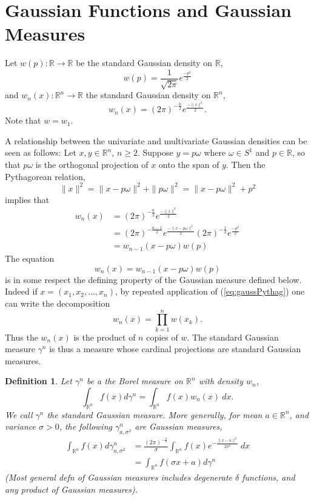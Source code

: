 \documentclass{amsart}
\newtheorem{definition}[theorem]{Definition}
\theoremstyle{remark}
\numberwithin{equation}{section}
\newcommand{\RR}{\mathbb{R}}
\begin{document}
\newpage
\section{Gaussian Functions and Gaussian Measures}
Let $w(p) : \RR \rightarrow \RR$  be the standard Gaussian density on $\RR$,
\[
    w(p) = \frac1{\sqrt{2\pi}}e^{\frac{-p^2}2}
\]
and $w_n(x) : \RR^n \rightarrow \RR$ the standard Gaussian density on $\RR^n$,
\[
    w_n(x) = (2\pi)^{-\frac n2} e^{\frac{-\|x\|^2}2}.
\]
Note that $w = w_1$.

A relationship between the univariate and multivariate Gaussian densities can be seen as follows: Let $x, y \in \RR^n$, $n \geq 2$. Suppose $y = p\omega$ where $\omega \in S^1$ and $p \in \RR$, so that $p\omega$ is the orthogonal projection of $x$ onto the span of $y$. Then the Pythagorean relation,
\[
    \|x\|^2 = \|x - p\omega\|^2 + \|p\omega\|^2 = \|x - p\omega\|^2 + p^2
\]
implies that
\begin{align*}
    w_n(x) 
    &= (2\pi)^{-\frac n2} e^{\frac{-\|x\|^2}2} \\
    &= (2\pi)^{-\frac{n-1}2} e^{\frac{-\|x - p\omega\|^2}2} (2\pi)^{-\frac12} e^{\frac{-p^2}2} \\
    &= w_{n-1}(x - p\omega)w(p)
\end{align*}
The equation
\begin{equation}\label{eq:gaussPythag}
    w_n(x) = w_{n-1}(x - p\omega)w(p)
\end{equation}
is in some respect the defining property of the Gaussian measure defined below. Indeed if $x = (x_1, x_2, \ldots, x_n)$, by repeated application of (\ref{eq:gaussPythag}) one can write the decomposition
\[
    w_n(x) = \prod_{k = 1}^n w(x_k).
\]
Thus the $w_n(x)$ is the product of $n$ copies of $w$. The standard Gaussian measure $\gamma^n$ is thus a measure whose cardinal projections are standard Gaussian measures.

\begin{definition}
Let $\gamma^n$ be a the Borel measure on $\RR^n$ with density $w_n$,
\[
    \int_{\RR^n} f(x) d\gamma^n = \int_{\RR^n} f(x) w_n(x) ~dx.
\]
We call $\gamma^n$ the standard Gaussian measure. More generally, for mean $a \in \RR^n$, and variance $\sigma > 0$, the following $\gamma^{n}_{a, \sigma^2}$ are Gaussian measures,
\begin{align*}
    \int_{\RR^n} f(x) d\gamma^n_{a,\sigma^2}
    &= \frac{(2\pi)^{-\frac n2}}{\sigma}  \int_{\RR^n} f(x) e^{-\frac{\|x - a\|^2}{2\sigma^2}} ~dx \\
    &= \int_{\RR^n} f(\sigma x + a) d\gamma^n
\end{align*}
(Most general defn of Gaussian measures includes degenerate $\delta$ functions, and any product of Gaussian measures).
\end{definition}
\end{document}

